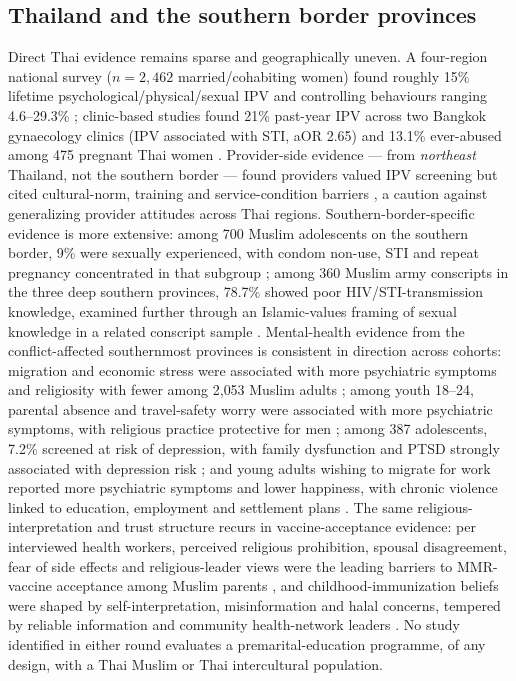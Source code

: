\documentclass[11pt]{article}
\begin{document}
\subsection{Thailand and the southern border provinces}
Direct Thai evidence remains sparse and geographically uneven. A four-region national survey ($n=2{,}462$ married/cohabiting women) found roughly 15\% lifetime psychological/physical/sexual IPV and controlling behaviours ranging 4.6--29.3\% \cite{ref72}; clinic-based studies found 21\% past-year IPV across two Bangkok gynaecology clinics (IPV associated with STI, aOR 2.65) \cite{ref73} and 13.1\% ever-abused among 475 pregnant Thai women \cite{ref74}. Provider-side evidence --- from \emph{northeast} Thailand, not the southern border --- found providers valued IPV screening but cited cultural-norm, training and service-condition barriers \cite{ref75}, a caution against generalizing provider attitudes across Thai regions. Southern-border-specific evidence is more extensive: among 700 Muslim adolescents on the southern border, 9\% were sexually experienced, with condom non-use, STI and repeat pregnancy concentrated in that subgroup \cite{ref76}; among 360 Muslim army conscripts in the three deep southern provinces, 78.7\% showed poor HIV/STI-transmission knowledge, examined further through an Islamic-values framing of sexual knowledge in a related conscript sample \cite{ref77,ref78}. Mental-health evidence from the conflict-affected southernmost provinces is consistent in direction across cohorts: migration and economic stress were associated with more psychiatric symptoms and religiosity with fewer among 2{,}053 Muslim adults \cite{ref79}; among youth 18--24, parental absence and travel-safety worry were associated with more psychiatric symptoms, with religious practice protective for men \cite{ref80}; among 387 adolescents, 7.2\% screened at risk of depression, with family dysfunction and PTSD strongly associated with depression risk \cite{ref81}; and young adults wishing to migrate for work reported more psychiatric symptoms and lower happiness, with chronic violence linked to education, employment and settlement plans \cite{ref82}. The same religious-interpretation and trust structure recurs in vaccine-acceptance evidence: per interviewed health workers, perceived religious prohibition, spousal disagreement, fear of side effects and religious-leader views were the leading barriers to MMR-vaccine acceptance among Muslim parents \cite{ref83}, and childhood-immunization beliefs were shaped by self-interpretation, misinformation and halal concerns, tempered by reliable information and community health-network leaders \cite{ref84}. No study identified in either round evaluates a premarital-education programme, of any design, with a Thai Muslim or Thai intercultural population.
\end{document}
